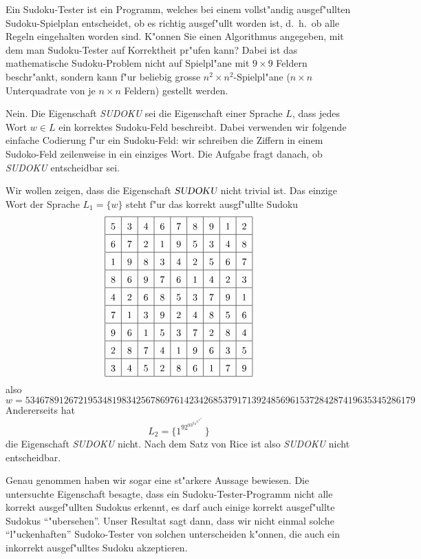 Ein Sudoku-Tester ist ein Programm, welches bei einem vollst"andig
ausgef"ullten Sudoku-Spielplan entscheidet, ob es richtig ausgef"ullt
worden ist, d.~h.~ob alle Regeln eingehalten worden sind. K"onnen Sie
einen Algorithmus angegeben, mit dem man Sudoku-Tester auf Korrektheit
pr"ufen kann? Dabei ist das mathematische Sudoku-Problem nicht auf
Spielpl"ane mit $9\times 9$ Feldern beschr"ankt,
sondern kann f"ur beliebig grosse
$n^2\times n^2$-Spielpl"ane ($n\times n$ Unterquadrate von je $n\times n$
Feldern) gestellt werden.

\begin{loesung}
Nein.  Die Eigenschaft \textsl{SUDOKU} sei die Eigenschaft einer
Sprache $L$, dass jedes Wort $w\in L$ ein korrektes Sudoku-Feld
beschreibt. Dabei verwenden wir folgende einfache
Codierung f"ur ein Sudoku-Feld: wir schreiben die Ziffern in
einem Sudoko-Feld zeilenweise in ein einziges Wort.
Die Aufgabe fragt danach, ob \textsl{SUDOKU} entscheidbar sei.

Wir wollen zeigen, dass die
Eigenschaft $\textsl{SUDOKU}$ nicht trivial ist.
Das einzige Wort der Sprache $L_1=\{w\}$  steht f"ur das korrekt
ausgf"ullte Sudoku
\[
\begin{tabular}{|c|c|c|c|c|c|c|c|c|}
\hline
\raisebox{0pt}[13pt][5pt]{5}&3&4&6&7&8&9&1&2\\
\hline
\raisebox{0pt}[13pt][5pt]{6}&7&2&1&9&5&3&4&8\\
\hline
\raisebox{0pt}[13pt][5pt]{1}&9&8&3&4&2&5&6&7\\
\hline
\raisebox{0pt}[13pt][5pt]{8}&6&9&7&6&1&4&2&3\\
\hline
\raisebox{0pt}[13pt][5pt]{4}&2&6&8&5&3&7&9&1\\
\hline
\raisebox{0pt}[13pt][5pt]{7}&1&3&9&2&4&8&5&6\\
\hline
\raisebox{0pt}[13pt][5pt]{9}&6&1&5&3&7&2&8&4\\
\hline
\raisebox{0pt}[13pt][5pt]{2}&8&7&4&1&9&6&3&5\\
\hline
\raisebox{0pt}[13pt][5pt]{3}&4&5&2&8&6&1&7&9\\
\hline
\end{tabular}
\]
also
\[
w=
534678912672195348198342567869761423426853791713924856961537284287419635345286179
\]
Andererseits hat
\[
L_2=\{1^92^93^94^95^96^97^98^99^9\}
\]
die Eigenschaft \textsl{SUDOKU} nicht. Nach dem Satz
von Rice ist also \textsl{SUDOKU} nicht entscheidbar.

Genau genommen haben wir sogar eine st"arkere Aussage bewiesen.
Die untersuchte Eigenschaft besagte, dass ein Sudoku-Tester-Programm nicht
alle korrekt ausgef"ullten Sudokus erkennt, es darf auch einige
korrekt ausgef"ullte Sudokus ``"ubersehen''. Unser Resultat sagt dann,
dass wir nicht einmal solche ``l"uckenhaften'' Sudoko-Tester von solchen
unterscheiden k"onnen, die auch ein inkorrekt ausgef"ulltes Sudoku
akzeptieren.
\end{loesung}
